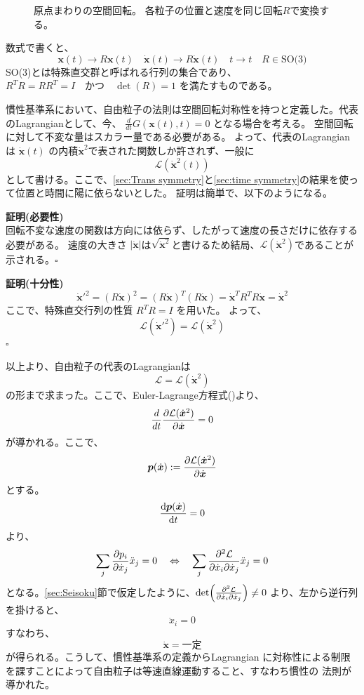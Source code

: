 \documentclass[a4paper,11pt]{ltjsarticle}
\newcommand{\La}{\mathcal{L}}
\begin{document}
\begin{figure}[ht]
\caption{原点まわりの空間回転。
各粒子の位置と速度を同じ回転$R$で変換する。}
\label{fig:spatial-rotation}
\end{figure}

数式で書くと、
\[
\bm{x}(t)\rightarrow R\bm{x}(t) \quad \dot{\bm{x}}(t) \rightarrow R\dot{\bm{x}}(t) \quad t\rightarrow t \quad R\in \text{SO(3)}
\]
SO(3)とは特殊直交群と呼ばれる行列の集合であり、$R^TR=RR^T=I\quad かつ\quad \det(R)=1$ を満たすものである。

慣性基準系において、自由粒子の法則は空間回転対称性を持つと定義した。代表のLagrangianとして、今、 $\frac{d}{dt}G(\bm{x}(t),t)=0$ となる場合を考える。
空間回転に対して不変な量はスカラー量である必要がある。
よって、代表のLagrangianは $\dot{\bm{x}}(t)$ の内積$\dot{\bm{x}}^2$で表された関数しか許されず、一般に
\[
\La(\dot{\bm{x}}^2(t))
\]
として書ける。ここで、\ref{sec:Trans symmetry}と\ref{sec:time symmetry}の結果を使って位置と時間に陽に依らないとした。
証明は簡単で、以下のようになる。

\textbf{証明(必要性)}
\\回転不変な速度の関数は方向には依らず、したがって速度の長さだけに依存する必要がある。
速度の大きさ $|\dot{\bm{x}}|$は$\sqrt{\dot{\bm{x}}^2}$と書けるため結局、$\La(\dot{\bm{x}}^2)$であることが示される。$\square$

\textbf{証明(十分性)}
\[
\dot{\bm{x}}'^2=(R\dot{\bm{x}})^2=(R\dot{\bm{x}})^T(R\dot{\bm{x}})=\dot{\bm{x}}^TR^TR\dot{\bm{x}}=\dot{\bm{x}}^2
\]
ここで、特殊直交行列の性質 $R^TR=I$ を用いた。
よって、\[
\La(\dot{\bm{x}}'^2)=\La(\dot{\bm{x}}^2)
\]
$\square$

以上より、自由粒子の代表のLagrangianは
\[
\La=\La(\dot{\bm{x}}^2)
\]
の形まで求まった。ここで、Euler-Lagrange方程式()より、
\[
\frac{d}{dt}\pdv{\La(\dot{\bm{x}}^2)}{\dot{\bm{x}}}=0
\]
が導かれる。ここで、
\[
\bm{p}(\dot{\bm{x}}):=\pdv{\La(\dot{\bm{x}}^2)}{\dot{\bm{x}}}
\]
とする。
\[
\dv{\bm{p}(\dot{\bm{x}})}{t}=0
\]
より、
\[
\sum_{j}\pdv{p_i}{\dot{x}_j}\ddot{x}_j=0 \quad \Leftrightarrow \quad \sum_{j}\pdv{\La}{\dot{x}_i}{\dot{x}_j}\ddot{x}_j=0
\]
となる。\ref{sec:Seisoku}節で仮定したように、$\det(\pdv{\La}{\dot{x}_i}{\dot{x}_j})\ne 0$
より、左から逆行列を掛けると、
\[
\ddot{x}_i=0
\]
すなわち、
\[
\dot{\bm{x}}=一定
\]
が得られる。こうして、慣性基準系の定義からLagrangian
に対称性による制限を課すことによって自由粒子は等速直線運動すること、すなわち慣性の
法則が導かれた。
\end{document}
